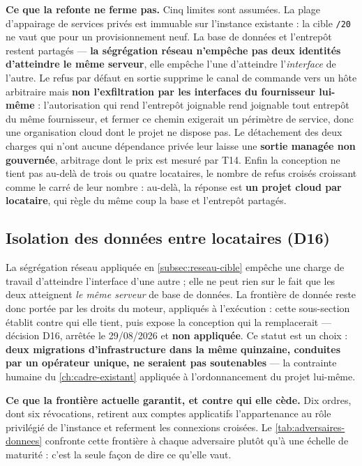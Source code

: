 \medskip
\noindent\textbf{Ce que la refonte ne ferme pas.}
Cinq limites sont assumées. La plage d'appairage de services privés est immuable sur l'instance
existante : la cible \texttt{/20} ne vaut que pour un provisionnement neuf. La base de données et
l'entrepôt restent partagés --- \textbf{la ségrégation réseau n'empêche pas deux identités
d'atteindre le même serveur}, elle empêche l'une d'atteindre l'\emph{interface} de l'autre. Le
refus par défaut en sortie supprime le canal de commande vers un hôte arbitraire mais \textbf{non
l'exfiltration par les interfaces du fournisseur lui-même} : l'autorisation qui rend l'entrepôt
joignable rend joignable tout entrepôt du même fournisseur, et fermer ce chemin exigerait un
périmètre de service, donc une organisation cloud dont le projet ne dispose pas. Le détachement des
deux charges qui n'ont aucune dépendance privée leur laisse une \textbf{sortie managée non
gouvernée}, arbitrage dont le prix est mesuré par T14. Enfin la conception ne tient pas au-delà de
trois ou quatre locataires, le nombre de refus croisés croissant comme le carré de leur nombre :
au-delà, la réponse est \textbf{un projet cloud par locataire}, qui règle du même coup la base et
l'entrepôt partagés.

\subsection{Isolation des données entre locataires (D16)}
\label{subsec:isolation-donnees}

La ségrégation réseau appliquée en \cref{subsec:reseau-cible} empêche une charge de travail
d'atteindre l'interface d'une autre ; elle ne peut rien sur le fait que les deux atteignent
\emph{le même serveur} de base de données. La frontière de donnée reste donc portée par les droits
du moteur, appliqués à l'exécution : cette sous-section établit contre qui elle tient, puis expose
la conception qui la remplacerait --- décision D16, arrêtée le 29/08/2026 et \textbf{non
appliquée}. Ce statut est un choix : \textbf{deux migrations d'infrastructure dans la même
quinzaine, conduites par un opérateur unique, ne seraient pas soutenables} --- la contrainte
humaine du \cref{ch:cadre-existant} appliquée à l'ordonnancement du projet lui-même.

\medskip
\noindent\textbf{Ce que la frontière actuelle garantit, et contre qui elle cède.}
Dix ordres, dont six révocations, retirent aux comptes applicatifs l'appartenance au rôle
privilégié de l'instance et referment les connexions croisées. Le \cref{tab:adversaires-donnees}
confronte cette frontière à chaque adversaire plutôt qu'à une échelle de maturité : c'est la seule
façon de dire ce qu'elle vaut.

